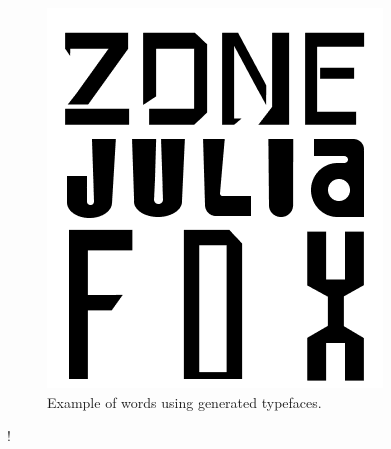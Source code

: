 \documentclass[11pt]{article}
\begin{document}
\begin{figure}[hbt!]
    \centering
    \includegraphics[width=0.25\columnwidth]{font_examples.png}
    \caption{Example of words using generated typefaces.}
    \label{fig:font_examples}
\end{figure}
\FloatBarrier!

\printbibliography
\end{document}
